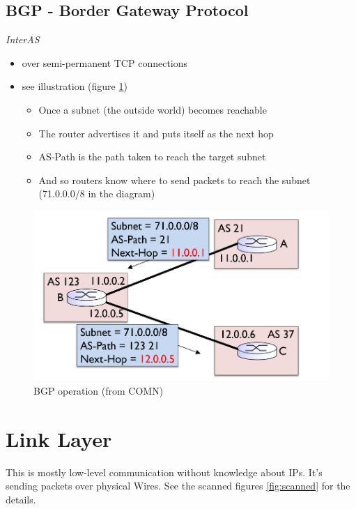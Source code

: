 \documentclass{article}
\begin{document}
\subsection{BGP - Border Gateway Protocol}
\textit{InterAS}
\begin{itemize}
    \item over semi-permanent TCP connections
    \item see illustration (figure \ref{fig:bgp})
    \begin{itemize}
        \item Once a subnet (the outside world) becomes reachable
        \item The router advertises it and puts itself as the next hop
        \item AS-Path is the path taken to reach the target subnet
        \item And so routers know where to send packets to reach the subnet (71.0.0.0/8 in the diagram)
    \end{itemize}
\end{itemize}

\begin{figure}
    \centering
    \includegraphics[width=1\textwidth]{figures/bgp.png}
    \caption{BGP operation (from COMN)}
    \label{fig:bgp}
\end{figure}

\section{Link Layer}
This is mostly low-level communication without knowledge about IPs. It's sending packets over physical Wires. See the scanned figures \ref{fig:scanned} for the details.
\end{document}
